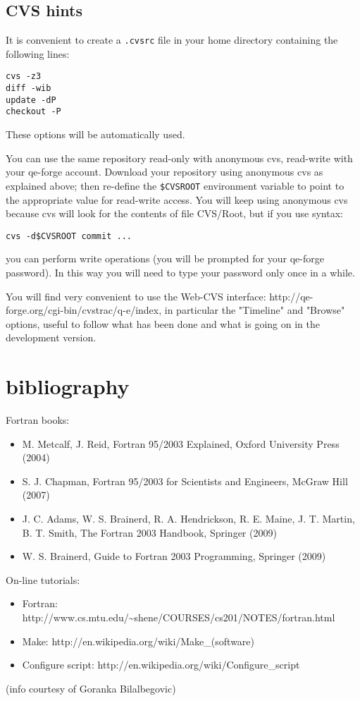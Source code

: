\documentclass[12pt,a4paper]{article}
\begin{document}
\subsection{CVS hints}

It is convenient to create a \texttt{.cvsrc} file in your
home directory containing the following lines:
\begin{verbatim}
cvs -z3
diff -wib
update -dP
checkout -P
\end{verbatim}
These options will be automatically used.

You can use the same repository read-only with anonymous cvs,
read-write with your qe-forge account. Download your repository 
using anonymous cvs as explained above; then re-define the
\texttt{\$CVSROOT} environment variable to point to the
appropriate value for read-write access. You will keep
using anonymous cvs because cvs will look for the contents of
file CVS/Root, but if you use syntax:
\begin{verbatim}
cvs -d$CVSROOT commit ...
\end{verbatim}
you can perform write operations (you will be prompted for your 
qe-forge password). In this way you will need to type 
your password only once in a while.

You will find very convenient to use the Web-CVS interface:
http://qe-forge.org/cgi-bin/cvstrac/q-e/index, in particular the 
"Timeline" and "Browse" options, useful to follow what
has been done and what is going on in the development version.

\section{bibliography}

Fortran books:
\begin{itemize}
\item 
M. Metcalf, J. Reid, Fortran 95/2003 Explained, Oxford University Press (2004) 
\item
S. J. Chapman, Fortran 95/2003 for Scientists and Engineers, McGraw Hill (2007) 
\item
J. C. Adams, W. S. Brainerd, R. A. Hendrickson, R. E. Maine, J. T. Martin,
B. T. Smith, The Fortran 2003 Handbook, Springer (2009) 
\item
W. S. Brainerd, Guide to Fortran 2003 Programming, Springer (2009)
\end{itemize}
On-line tutorials:
\begin{itemize}
\item Fortran:
http://www.cs.mtu.edu/\~{}shene/COURSES/cs201/NOTES/fortran.html
\item Make:  
http://en.wikipedia.org/wiki/Make\_(software)
\item Configure script:
http://en.wikipedia.org/wiki/Configure\_script
\end{itemize}
(info courtesy of Goranka Bilalbegovic)
\end{document}
